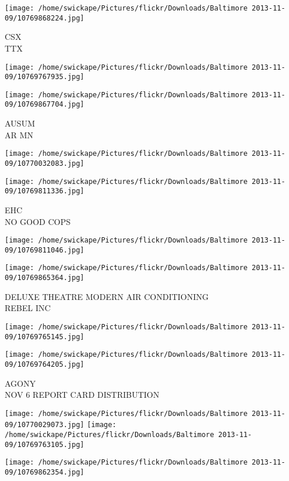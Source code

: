 \documentclass[10pt,letterpaper]{article}
\begin{document}
\vspace{0.25in}
\texttt{[image: /home/swickape/Pictures/flickr/Downloads/Baltimore 2013-11-09/10769868224.jpg]}

CSX\\
TTX
\pagebreak

\texttt{[image: /home/swickape/Pictures/flickr/Downloads/Baltimore 2013-11-09/10769767935.jpg]}

\vspace{0.25in}
\texttt{[image: /home/swickape/Pictures/flickr/Downloads/Baltimore 2013-11-09/10769867704.jpg]}

AUSUM\\
AR MN
\pagebreak

\texttt{[image: /home/swickape/Pictures/flickr/Downloads/Baltimore 2013-11-09/10770032083.jpg]}

\vspace{0.25in}
\texttt{[image: /home/swickape/Pictures/flickr/Downloads/Baltimore 2013-11-09/10769811336.jpg]}

EHC\\
NO GOOD COPS
\pagebreak

\texttt{[image: /home/swickape/Pictures/flickr/Downloads/Baltimore 2013-11-09/10769811046.jpg]}

\vspace{0.25in}
\texttt{[image: /home/swickape/Pictures/flickr/Downloads/Baltimore 2013-11-09/10769865364.jpg]}

DELUXE THEATRE MODERN AIR CONDITIONING\\
REBEL INC
\pagebreak

\texttt{[image: /home/swickape/Pictures/flickr/Downloads/Baltimore 2013-11-09/10769765145.jpg]}

\vspace{0.25in}
\texttt{[image: /home/swickape/Pictures/flickr/Downloads/Baltimore 2013-11-09/10769764205.jpg]}

AGONY\\
NOV 6 REPORT CARD DISTRIBUTION
\pagebreak

\texttt{[image: /home/swickape/Pictures/flickr/Downloads/Baltimore 2013-11-09/10770029073.jpg]}
\texttt{[image: /home/swickape/Pictures/flickr/Downloads/Baltimore 2013-11-09/10769763105.jpg]}

\vspace{0.25in}
\texttt{[image: /home/swickape/Pictures/flickr/Downloads/Baltimore 2013-11-09/10769862354.jpg]}
\end{document}

